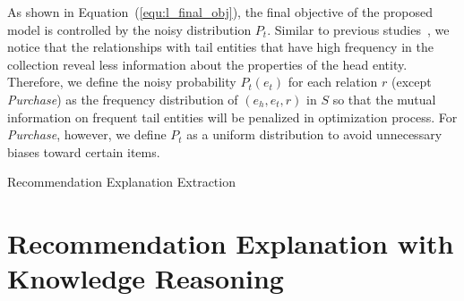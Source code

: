 \documentclass[algorithms,article,accept,moreauthors,pdftex,10pt,a4paper]{Definitions/mdpi}
\begin{document}
As shown in Equation~(\ref{equ:l_final_obj}), the final objective of the proposed model is controlled by the noisy distribution $P_t$.
Similar to previous studies~\cite{mikolov2013efficient,le2014distributed,ai2016analysis}, we notice that the relationships with tail entities that have high frequency in the collection reveal less information about the properties of the head entity.
Therefore, we define the noisy probability $P_t(e_t)$ for each relation $r$ (except \textit{Purchase}) as the frequency distribution of $(e_h, e_t, r)$ in $S$ so that the mutual information on frequent tail entities will be penalized in optimization process.
For \textit{Purchase}, however, we define $P_t$ as a uniform distribution to avoid unnecessary biases toward certain items.\vspace{12 pt}

\begin{algorithm}[H]
	\small
	\caption{Recommendation Explanation Extraction}
	\SetAlgoLined
	\label{alg:REE}
	 
\end{algorithm}


\section{Recommendation Explanation with Knowledge Reasoning}\label{sec:explanation}
\end{document}
